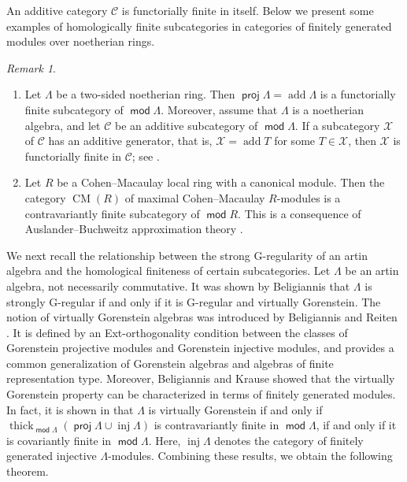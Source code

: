 \documentclass{amsart}
\theoremstyle{definition}
\theoremstyle{remark}
\newtheorem{rem}[thm]{Remark}
\numberwithin{equation}{thm}
\def\add{\operatorname{add}}
\def\C{\mathcal{C}}
\def\cm{\operatorname{CM}}
\def\Ext{\operatorname{Ext}}
\def\inj{\operatorname{inj}}
\def\mod{\operatorname{\mathsf{mod}}}
\def\proj{\operatorname{\mathsf{proj}}}
\def\thick{\operatorname{thick}}
\def\X{\mathcal{X}}
\begin{document}

An additive category $\C$ is functorially finite in itself.
Below we present some examples of homologically finite subcategories in categories of finitely generated modules over noetherian rings.

\begin{rem}\label{contperp}
\begin{enumerate}[\rm(1)]
   \item Let $\Lambda$ be a two-sided noetherian ring.
   Then $\proj\Lambda=\add\Lambda$ is a functorially finite subcategory of $\mod\Lambda$.
   Moreover, assume that $\Lambda$ is a noetherian algebra, and let $\C$ be an additive subcategory of $\mod\Lambda$.
   If a subcategory $\X$ of $\C$ has an additive generator, that is, $\X=\add T$ for some $T\in\X$, then $\X$ is functorially finite in $\C$; see \cite[Section 4]{AS}.
   \item Let $R$ be a Cohen--Macaulay local ring with a canonical module. Then the category $\cm(R)$ of maximal Cohen--Macaulay $R$-modules is a contravariantly finite subcategory of $\mod R$. This is a consequence of Auslander--Buchweitz approximation theory \cite{AB}.
\end{enumerate}
\end{rem}

We next recall the relationship between the strong G-regularity of an artin algebra and the homological finiteness of certain subcategories.
Let $\Lambda$ be an artin algebra, not necessarily commutative. 
It was shown by Beligiannis \cite[Corollary 4.11]{B98} that $\Lambda$ is strongly G-regular if and only if it is G-regular and virtually Gorenstein.
The notion of virtually Gorenstein algebras was introduced by Beligiannis and Reiten \cite{BR}.
It is defined by an Ext-orthogonality condition between the classes of Gorenstein projective modules and Gorenstein injective modules, and provides a common generalization of Gorenstein algebras and algebras of finite representation type.
Moreover, Beligiannis and Krause \cite{BK} showed that the virtually Gorenstein property can be characterized in terms of finitely generated modules.
In fact, it is shown in \cite[Theorem 1]{BK} that $\Lambda$ is virtually Gorenstein if and only if $\thick_{\mod\Lambda}(\proj\Lambda\cup\inj\Lambda)$ is contravariantly finite in $\mod\Lambda$, if and only if it is covariantly finite in $\mod\Lambda$.
Here, $\inj\Lambda$ denotes the category of finitely generated injective $\Lambda$-modules.
Combining these results, we obtain the following theorem.
\end{document}
